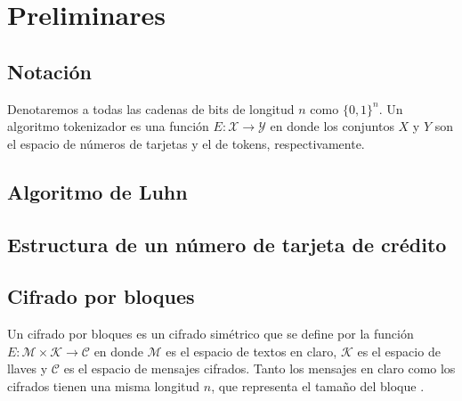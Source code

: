 %
%

\section{Preliminares}



\subsection{Notación}


Denotaremos a todas las cadenas de bits de longitud $ n $ como $ \{ 0, 1 \}^n $.
Un algoritmo tokenizador es una función $ E: \mathcal{X} \rightarrow
\mathcal{Y} $ en donde los conjuntos $ X $ y $ Y $ son el espacio de números de
tarjetas y el de tokens, respectivamente.

\subsection{Algoritmo de Luhn}


\subsection{Estructura de un número de tarjeta de crédito}

\subsection{Cifrado por bloques}

Un cifrado por bloques es un cifrado simétrico que se define por la función $ E:
\mathcal{M} \times \mathcal{K} \rightarrow \mathcal{C} $ en donde $ \mathcal{M} $
es el espacio de textos en claro, $ \mathcal{K} $ es el espacio de llaves y $
\mathcal{C} $ es el espacio de mensajes cifrados. Tanto los mensajes en claro
como los cifrados tienen una misma longitud $ n $, que representa el tamaño del
bloque \cite{menezes}.


